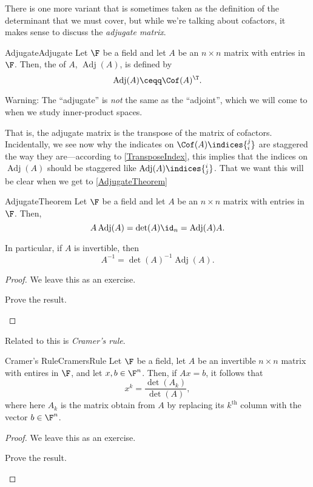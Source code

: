 There is one more variant that is sometimes taken as the definition of the determinant that we must cover, but while we're talking about cofactors, it makes sense to discuss the \emph{adjugate matrix}.
\begin{dfn}{Adjugate}{Adjugate}
	Let $\F$ be a field and let $A$ be an $n\times n$ matrix with entries in $\F$.  Then, the  of $A$, $\operatorname{Adj}(A)$, is defined by
	\begin{equation}
		\operatorname{Adj}(A)\ceqq \Cof (A)^{\T}.
	\end{equation}
	\begin{rmk}
		Warning:  The ``adjugate'' is \emph{not} the same as the ``adjoint'', which we will come to when we study inner-product spaces.
	\end{rmk}
	\begin{rmk}
		That is, the adjugate matrix is the transpose of the matrix of cofactors.  Incidentally, we see now why the indicates on $\Cof (A)\indices{_i^j}$ are staggered the way they are---according to \cref{TransposeIndex}, this implies that the indices on $\operatorname{Adj}(A)$ should be staggered like $\operatorname{Adj}(A)\indices{^i_j}$.  That we want this will be clear when we get to \cref{AdjugateTheorem}
	\end{rmk}
\end{dfn}
\begin{thm}{}{AdjugateTheorem}
	Let $\F$ be a field and let $A$ be an $n\times n$ matrix with entries in $\F$.  Then,
	\begin{equation}
		A\operatorname{Adj}(A)=\det (A)\id _n=\operatorname{Adj}(A)A.
	\end{equation}
	\begin{rmk}
		In particular, if $A$ is invertible, then
		\begin{equation}
			A^{-1}=\det (A)^{-1}\operatorname{Adj}(A).
		\end{equation}
	\end{rmk}
	\begin{proof}
		We leave this as an exercise.
		\begin{exr}[breakable=false]{}{}
			Prove the result.
		\end{exr}
	\end{proof}
\end{thm}
Related to this is \emph{Cramer's rule}.
\begin{thm}{Cramer's Rule}{CramersRule}
	Let $\F$ be a field, let $A$ be an invertible $n\times n$ matrix with entires in $\F$, and let $x,b\in \F ^n$.  Then, if $Ax=b$, it follows that
	\begin{equation}
		x^k=\frac{\det (A_k)}{\det (A)},
	\end{equation}
	where here $A_k$ is the matrix obtain from $A$ by replacing its $k^{\text{th}}$ column with the vector $b\in \F ^n$.
	\begin{proof}
		We leave this as an exercise.
		\begin{exr}[breakable=false]{}{}
			Prove the result.
		\end{exr}
	\end{proof}
\end{thm}

